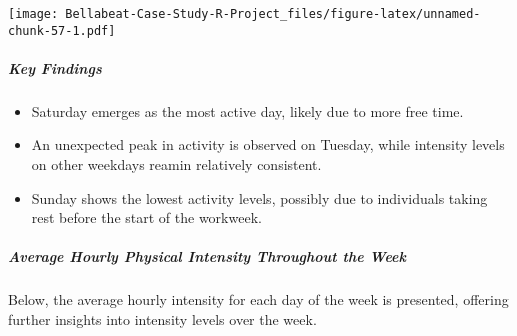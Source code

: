 \documentclass[
]{article}
\providecommand{\tightlist}{%
  \setlength{\itemsep}{0pt}\setlength{\parskip}{0pt}}
\begin{document}
\texttt{[image: Bellabeat-Case-Study-R-Project\_files/figure-latex/unnamed-chunk-57-1.pdf]}

\hypertarget{key-findings-3}{%
\subparagraph{Key Findings}\label{key-findings-3}}

\begin{itemize}
\tightlist
\item
  Saturday emerges as the most active day, likely due to more free time.
\item
  An unexpected peak in activity is observed on Tuesday, while intensity
  levels on other weekdays reamin relatively consistent.
\item
  Sunday shows the lowest activity levels, possibly due to individuals
  taking rest before the start of the workweek.
\end{itemize}

\hypertarget{average-hourly-physical-intensity-throughout-the-week}{%
\subparagraph{Average Hourly Physical Intensity Throughout the
Week}\label{average-hourly-physical-intensity-throughout-the-week}}

Below, the average hourly intensity for each day of the week is
presented, offering further insights into intensity levels over the
week.
\end{document}
